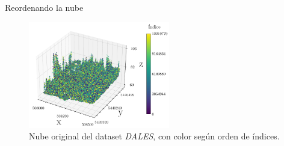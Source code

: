 \documentclass[aspectratio=169]{beamer}
\begin{document}
\begin{frame}{Reordenando la nube}
    \begin{figure}
        \centering
        \includegraphics[width=0.55\textwidth]{img/plot_5080-54400_unencoded.pdf}
        \caption{Nube original del dataset \textit{DALES}, con color según orden de índices.}
    \end{figure}
\end{frame}
\end{document}
